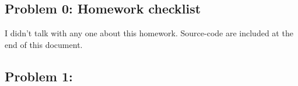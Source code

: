 \documentclass{article}
\begin{document}
 



\hypertarget{problem_0_homework_checklist_2}{}
\subsection*{{Problem 0: Homework checklist}}
\label{}

\checkmark	I didn't talk with any one about this homework. \newline
\checkmark 	Source-code are included at the end of this document. 

\hypertarget{}{}
\subsection*{{Problem 1: }}
\label{}
\end{document}
